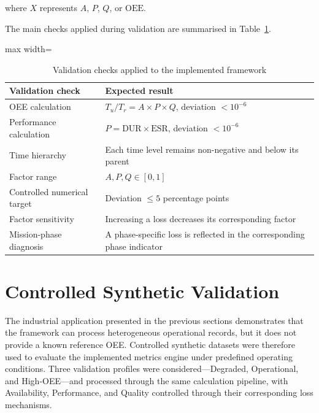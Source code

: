 where $X$ represents $A$, $P$, $Q$, or $\mathrm{OEE}$.

The main checks applied during validation are summarised in Table~\ref{tab:validation-checks-implemented-framework}.

\begin{table}[htbp]
\small
\renewcommand{\arraystretch}{1.15}
\centering
\caption{Validation checks applied to the implemented framework}
\label{tab:validation-checks-implemented-framework}
\begin{adjustbox}{max width=\textwidth}
\begin{tabular}{|p{4.5cm}|p{11.0cm}|}
\hline
\textbf{Validation check} & \textbf{Expected result} \\
\hline
OEE calculation & $T_u/T_r = A \times P \times Q$, deviation $< 10^{-6}$ \\
\hline
Performance calculation & $P = \mathrm{DUR} \times \mathrm{ESR}$, deviation $< 10^{-6}$ \\
\hline
Time hierarchy & Each time level remains non-negative and below its parent \\
\hline
Factor range & $A, P, Q \in [0,1]$ \\
\hline
Controlled numerical target & Deviation $\leq 5$ percentage points \\
\hline
Factor sensitivity & Increasing a loss decreases its corresponding factor \\
\hline
Mission-phase diagnosis & A phase-specific loss is reflected in the corresponding phase indicator \\
\hline
\end{tabular}
\end{adjustbox}
\end{table}
\section{Controlled Synthetic Validation}
\label{sec:controlled-synthetic-validation}

The industrial application presented in the previous sections demonstrates that the framework can process heterogeneous operational records, but it does not provide a known reference OEE. Controlled synthetic datasets were therefore used to evaluate the implemented metrics engine under predefined operating conditions. Three validation profiles were considered—Degraded, Operational, and High-OEE—and processed through the same calculation pipeline, with Availability, Performance, and Quality controlled through their corresponding loss mechanisms.
